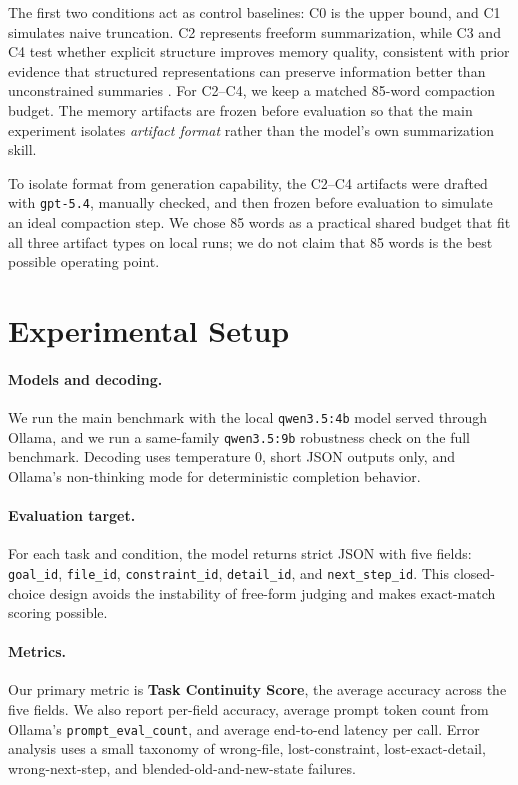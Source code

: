 \documentclass[11pt]{article}
\begin{document}
The first two conditions act as control baselines: C0 is the upper bound, and C1 simulates naive truncation. C2 represents freeform summarization, while C3 and C4 test whether explicit structure improves memory quality, consistent with prior evidence that structured representations can preserve information better than unconstrained summaries \citep{hwang-etal-2024-enhancing}. For C2--C4, we keep a matched 85-word compaction budget. The memory artifacts are frozen before evaluation so that the main experiment isolates \emph{artifact format} rather than the model's own summarization skill.

To isolate format from generation capability, the C2--C4 artifacts were drafted with \texttt{gpt-5.4}, manually checked, and then frozen before evaluation to simulate an ideal compaction step. We chose 85 words as a practical shared budget that fit all three artifact types on local runs; we do not claim that 85 words is the best possible operating point.

\section{Experimental Setup}
\paragraph{Models and decoding.}
We run the main benchmark with the local \texttt{qwen3.5:4b} model served through Ollama, and we run a same-family \texttt{qwen3.5:9b} robustness check on the full benchmark. Decoding uses temperature 0, short JSON outputs only, and Ollama's non-thinking mode for deterministic completion behavior.

\paragraph{Evaluation target.}
For each task and condition, the model returns strict JSON with five fields:
\texttt{goal\_id}, \texttt{file\_id}, \texttt{constraint\_id}, \texttt{detail\_id}, and \texttt{next\_step\_id}. This closed-choice design avoids the instability of free-form judging and makes exact-match scoring possible.

\paragraph{Metrics.}
Our primary metric is \textbf{Task Continuity Score}, the average accuracy across the five fields. We also report per-field accuracy, average prompt token count from Ollama's \texttt{prompt\_eval\_count}, and average end-to-end latency per call. Error analysis uses a small taxonomy of wrong-file, lost-constraint, lost-exact-detail, wrong-next-step, and blended-old-and-new-state failures.
\end{document}
